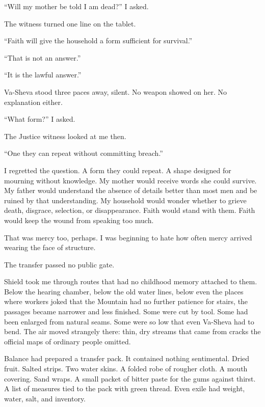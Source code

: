 ``Will my mother be told I am dead?'' I asked.\par

The witness turned one line on the tablet.\par

``Faith will give the household a form sufficient for survival.''\par

``That is not an answer.''\par

``It is the lawful answer.''\par

Va-Sheva stood three paces away, silent. No weapon showed on her. No explanation either.\par

``What form?'' I asked.\par

The Justice witness looked at me then.\par

``One they can repeat without committing breach.''\par

I regretted the question. A form they could repeat. A shape designed for mourning without knowledge. My mother would receive words she could survive. My father would understand the absence of details better than most men and be ruined by that understanding. My household would wonder whether to grieve death, disgrace, selection, or disappearance. Faith would stand with them. Faith would keep the wound from speaking too much.\par

That was mercy too, perhaps. I was beginning to hate how often mercy arrived wearing the face of structure.\par

The transfer passed no public gate.\par

Shield took me through routes that had no childhood memory attached to them. Below the hearing chamber, below the old water lines, below even the places where workers joked that the Mountain had no further patience for stairs, the passages became narrower and less finished. Some were cut by tool. Some had been enlarged from natural seams. Some were so low that even Va-Sheva had to bend. The air moved strangely there: thin, dry streams that came from cracks the official maps of ordinary people omitted.\par

Balance had prepared a transfer pack. It contained nothing sentimental. Dried fruit. Salted strips. Two water skins. A folded robe of rougher cloth. A mouth covering. Sand wraps. A small packet of bitter paste for the gums against thirst. A list of measures tied to the pack with green thread. Even exile had weight, water, salt, and inventory.\par

